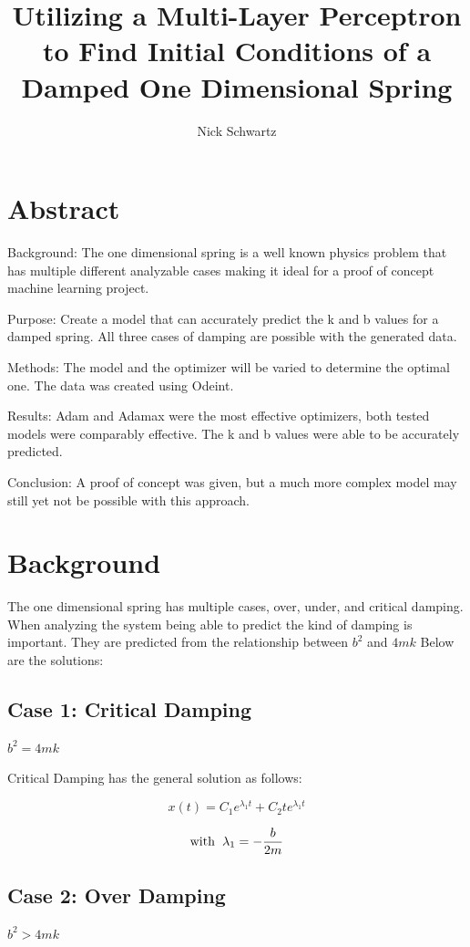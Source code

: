 \documentclass[12pt]{article}
\title{Utilizing a Multi-Layer Perceptron to Find Initial Conditions of a Damped One Dimensional Spring}
\author{Nick Schwartz}
\date{}
\begin{document}
	\maketitle
	\section*{Abstract}

	Background: The one dimensional spring is a well known physics problem that has multiple different analyzable cases making it ideal for a proof of concept machine learning project.

	Purpose: Create a model that can accurately predict the k and b values for a damped spring. All three cases of damping are possible with the generated data.

	Methods: The model and the optimizer will be varied to determine the optimal one. The data was created using Odeint.

	Results: Adam and Adamax were the most effective optimizers, both tested models were comparably effective. The k and b values were able to be accurately predicted.

	Conclusion: A proof of concept was given, but a much more complex model may still yet not be possible with this approach.

	\section*{Background}

	The one dimensional spring has multiple cases, over, under, and critical damping. When analyzing the system being able to predict the kind of damping is important. They are predicted from the relationship between $b^2$ and $4mk$ Below are the solutions:

	\subsection*{Case 1: Critical Damping}
	$b^2 = 4mk$

	Critical Damping has the general solution as follows:

	$$ x(t) = C_1e^{\lambda_1t} +C_2te^{\lambda_1t} $$

	$$ \text{with}\hspace{2mm}\lambda_1 = -\dfrac{b}{2m}$$

	\subsection*{Case 2: Over Damping}
	$b^2 > 4mk$
\end{document}
